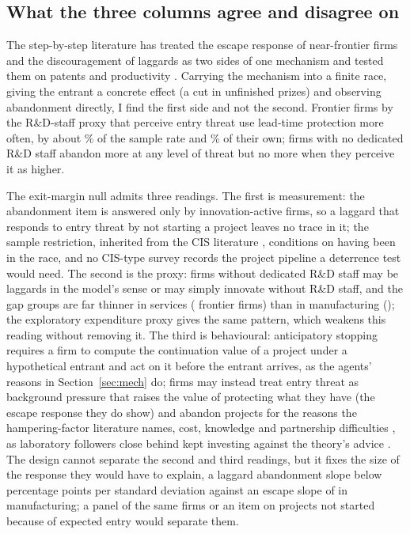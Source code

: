 \documentclass[preprint,12pt,authoryear]{elsarticle}
\begin{document}
\subsection{What the three columns agree and disagree on}

The step-by-step literature has treated the escape response of near-frontier firms and the discouragement of laggards as two sides of one mechanism and tested them on patents and productivity \citep{aghion2005competition,aghion2009entry}. Carrying the mechanism into a finite race, giving the entrant a concrete effect (a cut in unfinished prizes) and observing abandonment directly, I find the first side and not the second. Frontier firms by the R\&D-staff proxy that perceive entry threat use lead-time protection more often, by about \KISHOneRelMeanPct\% of the sample rate and \KISHOneRelFrontierPct\% of their own; firms with no dedicated R\&D staff abandon more at any level of threat but no more when they perceive it as higher.

The exit-margin null admits three readings. The first is measurement: the abandonment item is answered only by innovation-active firms, so a laggard that responds to entry threat by not starting a project leaves no trace in it; the sample restriction, inherited from the CIS literature \citep{garciavega2010determinants,klingebiel2021optionality}, conditions on having been in the race, and no CIS-type survey records the project pipeline a deterrence test would need. The second is the proxy: firms without dedicated R\&D staff may be laggards in the model's sense or may simply innovate without R\&D staff, and the gap groups are far thinner in services (\SecGapNServTwo{} frontier firms) than in manufacturing (\SecGapNManuTwo); the exploratory expenditure proxy gives the same pattern, which weakens this reading without removing it. The third is behavioural: anticipatory stopping requires a firm to compute the continuation value of a project under a hypothetical entrant and act on it before the entrant arrives, as the agents' reasons in Section~\ref{sec:mech} do; firms may instead treat entry threat as background pressure that raises the value of protecting what they have (the escape response they do show) and abandon projects for the reasons the hampering-factor literature names, cost, knowledge and partnership difficulties \citep{garciavega2010determinants,lhuillery2009rd,deste2012what}, as laboratory followers close behind kept investing against the theory's advice \citep{zizzo2002racing,breitmoser2010understanding}. The design cannot separate the second and third readings, but it fixes the size of the response they would have to explain, a laggard abandonment slope below \MDEQuitPp{} percentage points per standard deviation against an escape slope of \RobManuHOnePp{} in manufacturing; a panel of the same firms or an item on projects not started because of expected entry would separate them.
\end{document}

